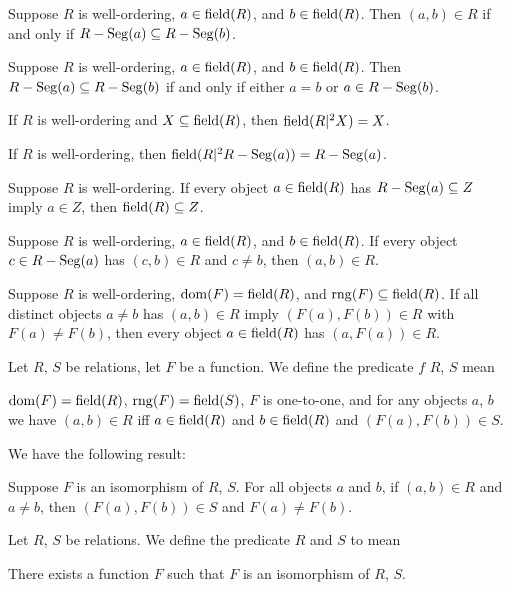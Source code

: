 \documentclass{article}
\begin{document}
\begin{thm}
\begin{enumerate}[label=(\roman*)]
  \end{enumerate}
\item\label{wellord1:29} Suppose $R$ is well-ordering, $a\in\operatorname{field}(R)$, and
  $b\in\operatorname{field}(R)$. Then $(a,b)\in R$ if and only if $R-\operatorname{Seg}(a)\subseteq R-\operatorname{Seg}(b)$.
\item\label{wellord1:30} Suppose $R$ is well-ordering, $a\in\operatorname{field}(R)$, and
  $b\in\operatorname{field}(R)$. Then $R-\operatorname{Seg}(a)\subseteq R-\operatorname{Seg}(b)$ if and only if
  either $a=b$ or $a\in R-\operatorname{Seg}(b)$.
\item\label{wellord1:31} If $R$ is well-ordering and
  $X\subseteq\operatorname{field}(R)$, then $\operatorname{field}(R|^{2}X)=X$.
\item\label{wellord1:32} If $R$ is well-ordering, then $\operatorname{field}(R|^{2}R-\operatorname{Seg}(a))=R-\operatorname{Seg}(a)$.
\item\label{wellord1:33} Suppose $R$ is well-ordering. If every object
  $a\in\operatorname{field}(R)$ has $R-\operatorname{Seg}(a)\subseteq Z$ imply $a\in Z$, then
  $\operatorname{field}(R)\subseteq Z$.
\item\label{wellord1:34} Suppose $R$ is well-ordering, $a\in\operatorname{field}(R)$,
  and $b\in\operatorname{field}(R)$. If every object $c\in R-\operatorname{Seg}(a)$ has $(c,b)\in R$
  and $c\neq b$, then $(a,b)\in R$.
\item\label{wellord1:35} Suppose $R$ is well-ordering,
  $\operatorname{dom}(F)=\operatorname{field}(R)$, and $\operatorname{rng}(F)\subseteq\operatorname{field}(R)$.
  If all distinct objects $a\neq b$ has $(a,b)\in R$ imply
  $(F(a),F(b))\in R$ with $F(a)\neq F(b)$,
  then every object $a\in\operatorname{field}(R)$ has $(a,F(a))\in R$.
\end{thm}

\begin{definition}
Let $R$, $S$ be relations, let $F$ be a function.
We define the predicate $f$  $R$, $S$ mean
\begin{defn}
\item $\operatorname{dom}(F)=\operatorname{field}(R)$, $\operatorname{rng}(F)=\operatorname{field}(S)$, $F$ is one-to-one,
  and for any objects $a$, $b$ we have $(a,b)\in R$ iff $a\in\operatorname{field}(R)$
  and $b\in\operatorname{field}(R)$ and $(F(a),F(b))\in S$.
\end{defn}
\end{definition}

We have the following result:
\begin{thm}
\item\label{wellord1:36} Suppose $F$ is an isomorphism of $R$, $S$.
  For all objects $a$ and $b$, if $(a,b)\in R$ and $a\neq b$,
  then $(F(a),F(b))\in S$ and $F(a)\neq F(b)$.
\end{thm}

\begin{definition}
Let $R$, $S$ be relations. We define the predicate $R$ and $S$
 to mean
\begin{defn}
\item There exists a function $F$ such that $F$ is an isomorphism of
  $R$, $S$.
\end{defn}
\end{definition}
\end{document}
